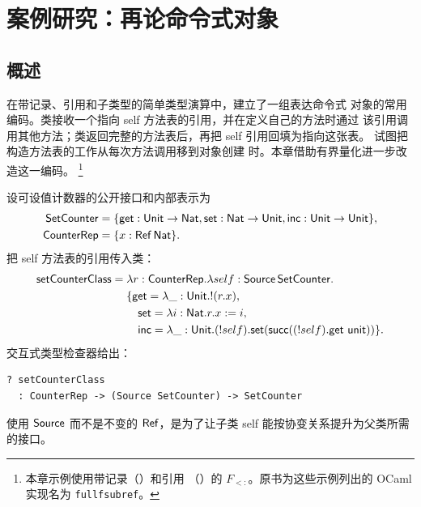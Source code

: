 
\chapter{案例研究：再论命令式对象}
\label{chap:27}

\section*{概述}

在带记录、引用和子类型的简单类型演算中，建立了一组表达命令式
对象的常用编码。类接收一个指向 self 方法表的引用，并在定义自己的方法时通过
该引用调用其他方法；类返回完整的方法表后，再把 self 引用回填为指向这张表。
试图把构造方法表的工作从每次方法调用移到对象创建
时。本章借助有界量化进一步改造这一编码。
\footnote{本章示例使用带记录（）和引用
（）的 \(F_{<:}\)。原书为这些示例列出的 OCaml
实现名为 \texttt{fullfsubref}。}

设可设值计数器的公开接口和内部表示为
\[
\begin{aligned}
\mathsf{SetCounter}
 &=\{\mathsf{get}:\mathsf{Unit}\to\mathsf{Nat},
      \mathsf{set}:\mathsf{Nat}\to\mathsf{Unit},
      \mathsf{inc}:\mathsf{Unit}\to\mathsf{Unit}\},\\
\mathsf{CounterRep}
 &=\{x:\mathsf{Ref}\,\mathsf{Nat}\}.
\end{aligned}
\]
把 self 方法表的引用传入类：
\[
\begin{aligned}
\mathsf{setCounterClass}
={}&\lambda r:\mathsf{CounterRep}.
\lambda self:\mathsf{Source}\,\mathsf{SetCounter}.\\
&\{\mathsf{get}=\lambda\_:\mathsf{Unit}.!(r.x),\\
&\quad\mathsf{set}=\lambda i:\mathsf{Nat}.r.x:=i,\\
&\quad\mathsf{inc}=\lambda\_:\mathsf{Unit}.
(!self).\mathsf{set}
(\mathsf{succ}((!self).\mathsf{get}\ \mathsf{unit}))\}.
\end{aligned}
\]
交互式类型检查器给出：
\begin{lstlisting}
? setCounterClass
  : CounterRep -> (Source SetCounter) -> SetCounter
\end{lstlisting}
使用 \(\mathsf{Source}\) 而不是不变的 \(\mathsf{Ref}\)，是为了让子类
self 能按协变关系提升为父类所需的接口。


